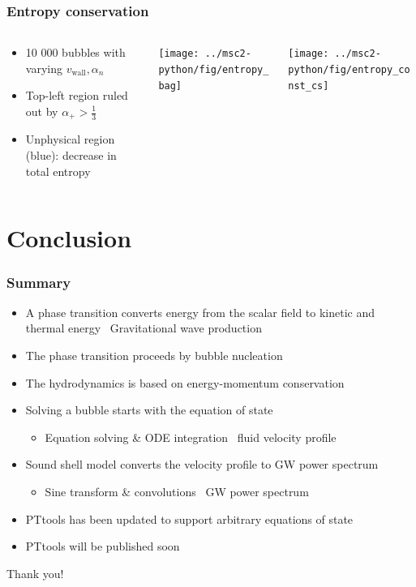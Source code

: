 \begin{frame}
    \frametitle{Entropy conservation}
    \begin{columns}
    \begin{column}{0.3\textwidth}
        \begin{itemize}
            \item 10 000 bubbles with varying $v_\text{wall}, \alpha_n$
            \item Top-left region ruled out by $\alpha_+ > \frac{1}{3}$
            \item Unphysical region (blue): decrease in total entropy
        \end{itemize}%
    \end{column}
    \begin{column}{0.35\textwidth}
        \texttt{[image: ../msc2-python/fig/entropy\_bag]}
    \end{column}
    \begin{column}{0.35\textwidth}
        \texttt{[image: ../msc2-python/fig/entropy\_const\_cs]}
    \end{column}
    \end{columns}
\end{frame}

\section{Conclusion}

\begin{frame}
    \frametitle{Summary}
    \begin{itemize}
        \item A phase transition converts energy from the scalar field to kinetic and thermal energy
            \textrightarrow \ Gravitational wave production
        \item The phase transition proceeds by bubble nucleation
        \item The hydrodynamics is based on energy-momentum conservation
        \item Solving a bubble starts with the equation of state
        \begin{itemize}
            \item Equation solving \& ODE integration \textrightarrow \ fluid velocity profile
        \end{itemize}
        \item Sound shell model converts the velocity profile to GW power spectrum
        \begin{itemize}
            \item Sine transform \& convolutions \textrightarrow \ GW power spectrum
        \end{itemize}
        \item PTtools has been updated to support arbitrary equations of state
        \item PTtools will be published soon
    \end{itemize}
    Thank you!
\end{frame}

